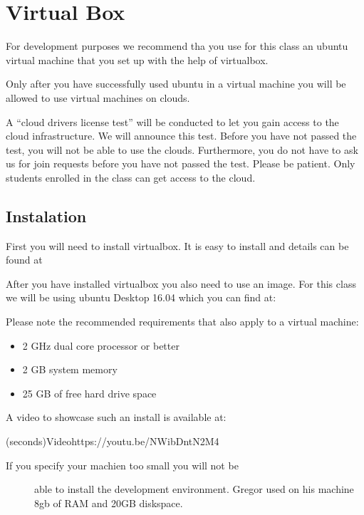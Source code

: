 

\chapter{Virtual Box}
\label{S:virtual-box}

\FILENAME

For development purposes we recommend tha you use for this class an
ubuntu virtual machine that you set up with the help of virtualbox.

Only after you have successfully used ubuntu in a virtual machine you
will be allowed to use virtual machines on clouds.

A ``cloud drivers license test'' will be conducted to let you gain
access to the cloud infrastructure. We will announce this test. Before
you have not passed the test, you will not be able to use the clouds.
Furthermore, you do not have to ask us for join requests before you have
not passed the test. Please be patient. Only students enrolled in the
class can get access to the cloud.

\section{Instalation}\label{creation}

First you will need to install virtualbox. It is easy to install and
details can be found at



After you have installed virtualbox you also need to use an image. For
this class we will be using ubuntu Desktop 16.04 which you can find at:



Please note the recommended requirements that also apply to a virtual
machine:

\begin{itemize}
\tightlist
\item
  2 GHz dual core processor or better
\item
  2 GB system memory
\item
  25 GB of free hard drive space
\end{itemize}

A video to showcase such an install is available at:

(seconds){Video}{https://youtu.be/NWibDntN2M4}

\begin{description}
\item[If you specify your machien too small you will not be]
able to install the development environment. Gregor used on his machine
8gb of RAM and 20GB diskspace.
\end{description}

